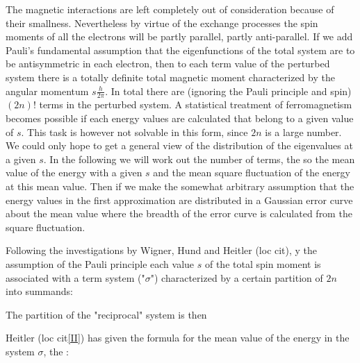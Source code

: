 \begin{paper}{1}
The magnetic interactions are left completely out of consideration because of their smallness. Nevertheless by virtue of the exchange processes the spin moments of all the electrons will be partly parallel, partly anti-parallel. If we add Pauli's fundamental assumption that the eigenfunctions of the total system are to be antisymmetric in each electron, then to each term value of the perturbed system there is a totally definite total magnetic moment characterized by the angular momentum $s\frac{h}{2\pi}$. In total there are (ignoring the Pauli principle and spin) $(2n)!$ terms in the perturbed system. A statistical treatment of ferromagnetism becomes possible if each energy values are calculated that belong to a given value of $s$. This task is however not solvable in this form, since $2n$ is a large number. We could only hope to get a general view of the distribution of the eigenvalues at a given $s$. In the following we will work out the number of terms, the  so the mean value of the energy with a given $s$ and the mean square fluctuation of the energy at this mean value. Then if we make the somewhat arbitrary assumption that the energy values in the first approximation are distributed in a Gaussian error curve about the mean value where the breadth of the error curve is calculated from the square fluctuation.

Following the investigations by Wigner, Hund and Heitler (loc cit),  y the assumption of the Pauli principle each value $s$ of the total spin moment is associated with a term system ("$\sigma$") characterized by a certain partition of $2n$ into summands:

The partition of the "reciprocal" system is then

Heitler (loc cit\ref{II}) has given the formula for the mean value of the energy in the system $\sigma$, the :


\end{paper}
